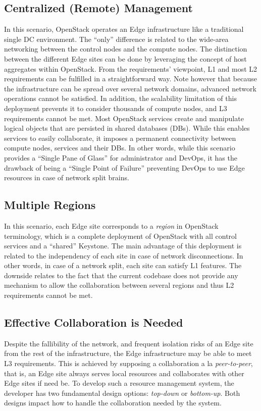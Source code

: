 \subsection{Centralized (Remote) Management}
\label{subsec:centralized_os}
In this scenario, OpenStack operates an Edge infrastructure
like a traditional single DC environment. %
The ``only'' difference is
related to the wide-area networking between the control nodes
and the compute nodes. The distinction between the different Edge
sites can be done by leveraging the concept of host aggregates
within OpenStack.
%
From the requirements' viewpoint, L1 and most L2 requirements can be
fulfilled in a straightforward way. Note however that because the
infrastructure can be spread over several network domains, advanced
network operations cannot be satisfied. 
In addition, the scalability
limitation of this deployment prevents it to consider thousands of
compute nodes, and L3 requirements cannot be met. Most OpenStack services create and
manipulate logical objects that are persisted in shared databases (DBs).
While this enables services to easily collaborate, it imposes a
permanent connectivity between compute nodes, services and their DBs.
In other words, while this scenario provides a ``Single Pane of
Glass'' for administrator and DevOps, it has the drawback of being a
``Single Point of Failure'' preventing DevOps to use Edge resources in
case of network split brains.



\subsection{Multiple Regions}
In this scenario, each Edge site corresponds to a \emph{region}
in OpenStack terminology, which is a complete deployment of
OpenStack with all control services and a ``shared'' Keystone.
The main advantage of this
deployment is related to the independency of each site in case of
network disconnections. In other words, in case of a network split,
each site can satisfy L1 features. The downside relates to the
fact that the current codebase does not provide any mechanism to allow
the collaboration between several regions and thus L2 requirements
cannot be met.


\subsection{Effective Collaboration is Needed}
Despite the fallibility of the network, and frequent isolation risks
of an Edge site from the rest of the infrastructure, the Edge
infrastructure may be able to meet L3 requirements. This
is achieved by supposing a collaboration a la \emph{peer-to-peer},
that is, an Edge site always serves local resources and collaborates
with other Edge sites if need be. To develop such a resource
management system, the developer has two fundamental design options:
\emph{top-down} or \emph{bottom-up}. Both designs impact how to handle
the collaboration needed by the system.

